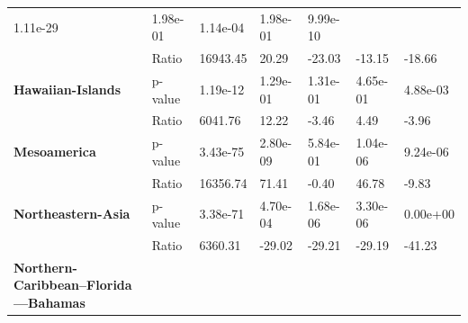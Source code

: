 \begin{table}[H]
{\begin{tabular}{lllllll}
            1.11e-29                                            &
            1.98e-01                                            &
            1.14e-04                                            &
            1.98e-01                                            &
            9.99e-10
            \\
            \textbf{}                                           & Ratio    &
            16943.45                                            & 20.29    &
            -23.03
                                                                & -13.15   &
            -18.66
            \\
            \textbf{Hawaiian-Islands}                           & p-value  &
            1.19e-12                                            & 1.29e-01 &
            1.31e-01                                            & 4.65e-01 &
            4.88e-03
            \\
            \textbf{}                                           & Ratio    &
            6041.76                                             & 12.22    &
            -3.46
                                                                & 4.49     &
            -3.96
            \\
            \textbf{Mesoamerica}                                & p-value  &
            3.43e-75                                            & 2.80e-09 &
            5.84e-01                                            & 1.04e-06 &
            9.24e-06
            \\
            \textbf{}                                           & Ratio    &
            16356.74                                            & 71.41    &
            -0.40
                                                                & 46.78    &
            -9.83
            \\
            \textbf{Northeastern-Asia}                          & p-value  &
            3.38e-71                                            & 4.70e-04 &
            1.68e-06                                            & 3.30e-06 &
            0.00e+00
            \\
            \textbf{}                                           & Ratio    &
            6360.31                                             & -29.02   &
            -29.21
                                                                & -29.19   &
            -41.23
            \\
            \textbf{Northern-Caribbean--Florida---Bahamas}      &

\end{tabular}}
\end{table}
